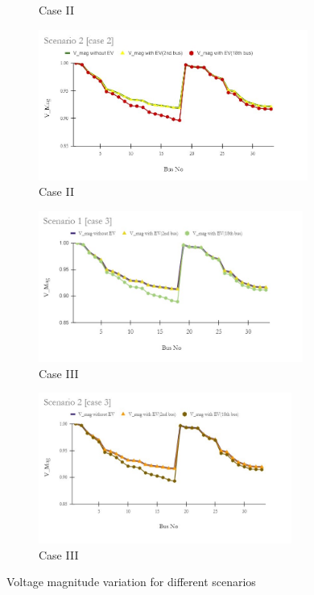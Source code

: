 \begin{figure}[!h]
\begin{subfigure}{.5\textwidth}
			\caption{Case II}
			\label{fig:LFb}
		\end{subfigure}
		\begin{subfigure}{.5\textwidth}
			\centering
			\includegraphics[width=.97\linewidth,height= 4.95cm]{./Figures/sc2_case2}
			\caption{Case II}
			\label{fig:LF2b}
		\end{subfigure}
		\begin{subfigure}{.5\textwidth}
			\centering
			\includegraphics[width=.97\linewidth,height= 4.95cm]{./Figures/sc1_case3}
			\caption{Case III}
			\label{fig:LFc}
		\end{subfigure}
		\begin{subfigure}{.5\textwidth}
			\centering
			\includegraphics[width=.97\linewidth,height= 4.95cm]{./Figures/sc2_case3}
			\caption{Case III}
			\label{fig:LF2c}
		\end{subfigure}
		\caption{ Voltage magnitude variation for different scenarios }
		\label{fig:loadprofile-scenario1}
	\end{figure} 
	
	


		
	
	
	